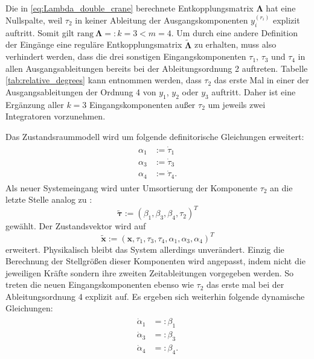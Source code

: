 Die in \eqref{eq:Lambda_double_crane} berechnete Entkopplungsmatrix $\boldsymbol{\Lambda}$ hat eine Nullspalte, weil $\tau_2$ in keiner Ableitung der Ausgangskomponenten $y_i^{(r_i)}$ explizit auftritt. Somit gilt ${\text{rang} \ \boldsymbol{\Lambda} =: k = 3 < m = 4}$. Um durch eine andere Definition der Eingänge eine reguläre Entkopplungsmatrix $\tilde{\boldsymbol{\Lambda}}$ zu erhalten, muss also verhindert werden, dass die drei sonstigen Eingangskomponenten $\tau_1$, $\tau_3$ und $\tau_4$ in allen Ausgangsableitungen bereits bei der Ableitungsordnung 2 auftreten. Tabelle \ref{tab:relative_degrees} kann entnommen werden, dass $\tau_{2}$ das erste Mal in einer der Ausgangsableitungen der Ordnung 4 von $y_1$, $y_2$ oder $y_3$ auftritt. Daher ist eine Ergänzung aller $k = 3$ Eingangskomponenten außer $\tau_2$ um jeweils zwei Integratoren vorzunehmen. \cite[S. 200]{NLRT_Roebenack} 

Das Zustandsraummodell wird um folgende definitorische Gleichungen erweitert:
\begin{align}
	\begin{split}
		\alpha_1 &:= \dot{\tau}_1 \\
		\alpha_3 &:= \dot{\tau}_3 \\
		\alpha_4 &:= \dot{\tau}_4 .
	\end{split}
\end{align}
Als neuer Systemeingang wird unter Umsortierung der Komponente $\tau_2$ an die letzte Stelle analog zu \cite[S. 201]{NLRT_Roebenack}:
\begin{equation}
	\tilde{\boldsymbol{\tau}} := (\beta_1, \beta_3, \beta_4, \tau_2)^T
\end{equation}
gewählt. Der Zustandsvektor wird auf
\begin{equation}
	\tilde{\mathbf{x}} := (\mathbf{x}, \tau_1, \tau_3, \tau_4, \alpha_1, \alpha_3, \alpha_4)^T
\end{equation}
erweitert. Physikalisch bleibt das System allerdings unverändert. Einzig die Berechnung der Stellgrößen dieser Komponenten wird angepasst, indem nicht die jeweiligen Kräfte sondern ihre zweiten Zeitableitungen vorgegeben werden. So treten die neuen Eingangskomponenten ebenso wie $\tau_2$ das erste mal bei der Ableitungsordnung 4 explizit auf. Es ergeben sich weiterhin folgende dynamische Gleichungen:
\begin{align}
	\begin{split}
		\dot{\alpha}_1 &=: \beta_1 \\
		\dot{\alpha}_3 &=: \beta_3 \\
		\dot{\alpha}_4 &=: \beta_4 .
	\end{split}
\end{align}

